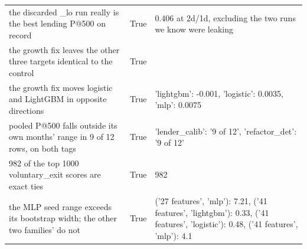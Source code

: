\begin{table}
\begin{tabular}{lrl}
the discarded _lo run really is the best lending P@500 on record & True & 0.406 at 2d/1d, excluding the two runs we know were leaking \\
the growth fix leaves the other three targets identical to the control & True &  \\
the growth fix moves logistic and LightGBM in opposite directions & True & {'lightgbm': -0.001, 'logistic': 0.0035, 'mlp': 0.0075} \\
pooled P@500 falls outside its own months' range in 9 of 12 rows, on both tags & True & {'lender_calib': '9 of 12', 'refactor_det': '9 of 12'} \\
982 of the top 1000 voluntary_exit scores are exact ties & True & 982 \\
the MLP seed range exceeds its bootstrap width; the other two families' do not & True & {('27 features', 'mlp'): 7.21, ('41 features', 'lightgbm'): 0.33, ('41 features', 'logistic'): 0.48, ('41 features', 'mlp'): 4.1} \\
\bottomrule
\end{tabular}
\end{table}
